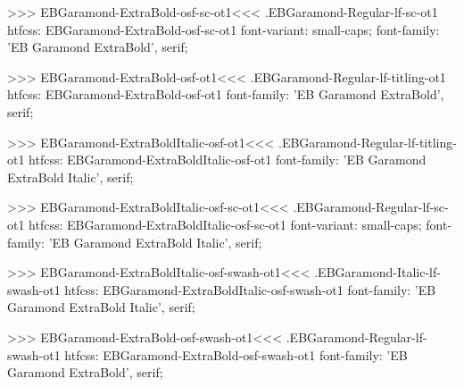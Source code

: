 {{{{{{{>>>
\<EBGaramond-ExtraBold-osf-sc-ot1\><<<
.EBGaramond-Regular-lf-sc-ot1
htfcss:  EBGaramond-ExtraBold-osf-sc-ot1  font-variant: small-caps; font-family: 'EB Garamond ExtraBold', serif;

>>>
\<EBGaramond-ExtraBold-osf-ot1\><<<
.EBGaramond-Regular-lf-titling-ot1
htfcss:  EBGaramond-ExtraBold-osf-ot1  font-family: 'EB Garamond ExtraBold', serif;

>>>
\<EBGaramond-ExtraBoldItalic-osf-ot1\><<<
.EBGaramond-Regular-lf-titling-ot1
htfcss:  EBGaramond-ExtraBoldItalic-osf-ot1  font-family: 'EB Garamond ExtraBold Italic', serif;

>>>
\<EBGaramond-ExtraBoldItalic-osf-sc-ot1\><<<
.EBGaramond-Regular-lf-sc-ot1
htfcss:  EBGaramond-ExtraBoldItalic-osf-sc-ot1  font-variant: small-caps; font-family: 'EB Garamond ExtraBold Italic', serif;

>>>
\<EBGaramond-ExtraBoldItalic-osf-swash-ot1\><<<
.EBGaramond-Italic-lf-swash-ot1
htfcss:  EBGaramond-ExtraBoldItalic-osf-swash-ot1  font-family: 'EB Garamond ExtraBold Italic', serif;

>>>
\<EBGaramond-ExtraBold-osf-swash-ot1\><<<
.EBGaramond-Regular-lf-swash-ot1
htfcss:  EBGaramond-ExtraBold-osf-swash-ot1  font-family: 'EB Garamond ExtraBold', serif;

}}}}}}}
